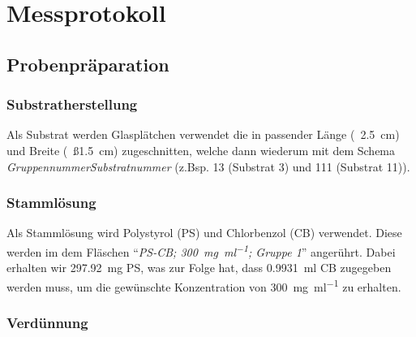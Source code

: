 
\def\skalierung{0.65}

\chapter{Messprotokoll}
\label{chap:protokoll}

\section{Probenpräparation}
\label{sec:prep}

\subsection{Substratherstellung}
\label{sub:substrat}
Als Substrat werden Glasplätchen verwendet die in passender Länge (~\SI{2,5}{\centi\metre}) und Breite (~ß\SI{1,5}{\centi\metre}) zugeschnitten, welche dann wiederum mit dem Schema \textit{GruppennummerSubstratnummer} (z.Bsp. 13 (Substrat 3) und 111 (Substrat 11)).

\subsection{Stammlösung}
\label{sub:stamm}
Als Stammlösung wird Polystyrol (PS) und Chlorbenzol (CB) verwendet. Diese werden im dem Fläschen \enquote{\textit{PS-CB; \SI{300}{\milli\gram\per\milli\litre}; Gruppe 1}} angerührt. Dabei erhalten wir \SI{297,92}{\milli\gram} PS, was zur Folge hat, dass \SI{0,9931}{\milli\litre} CB zugegeben werden muss, um die gewünschte Konzentration von \SI{300}{\milli\gram\per\milli\litre} zu erhalten.

\subsection{Verdünnung}
\label{sub:verduennung}

